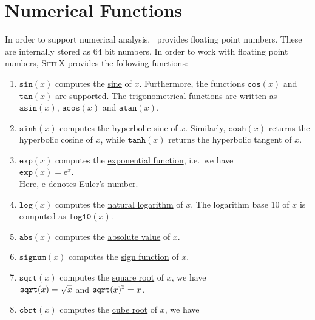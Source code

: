 \section{Numerical Functions}
In order to support numerical analysis, \setlx\ provides floating point numbers.  These are internally stored
as 64 bit numbers.  In order to work with floating point numbers,  \textsc{SetlX} provides the following functions:
\begin{enumerate}
\item $\texttt{sin}(x)$ computes the \href{https://en.wikipedia.org/wiki/Sine}{sine} of $x$.
      Furthermore, the  functions $\texttt{cos}(x)$ and $\texttt{tan}(x)$ are supported.  The
       trigonometrical functions are written as 
      $\texttt{asin}(x)$, $\texttt{acos}(x)$ and $\texttt{atan}(x)$.    
\item $\texttt{sinh}(x)$ computes the \href{https://en.wikipedia.org/wiki/Hyperbolic_function}{hyperbolic sine} of $x$.
      Similarly,  $\mathtt{cosh}(x)$ returns the hyperbolic cosine of $x$, while
      $\mathtt{tanh}(x)$ returns the hyperbolic tangent of $x$.
\item $\texttt{exp}(x)$ computes the \href{https://en.wikipedia.org/wiki/Exponential_function}{exponential
      function}, i.e.~we have 
      \\[0.2cm]
      \hspace*{1.3cm}
      $\texttt{exp}(x) = \mathrm{e}^x$.
      \\[0.2cm]
      Here, $\mathrm{e}$ denotes \href{https://en.wikipedia.org/wiki/E_(mathematical_constant)}{Euler's number}.
\item $\texttt{log}(x)$ computes the \href{https://en.wikipedia.org/wiki/Natural_logarithm}{natural logarithm} of  $x$.
      The logarithm base 10 of $x$ is computed as $\mathtt{log10}(x)$.
\item $\texttt{abs}(x)$ computes the \href{https://en.wikipedia.org/wiki/Absolute_value}{absolute value} of $x$.
\item $\mathtt{signum}(x)$ computes the \href{https://en.wikipedia.org/wiki/Sign_function}{sign function} of $x$.
\item $\texttt{sqrt}(x)$ computes the \href{https://en.wikipedia.org/wiki/Square_root}{square root} of $x$, we have
      \\[0.2cm]
      \hspace*{1.3cm}
      $\displaystyle\texttt{sqrt}(x) = \sqrt{x}$ \quad and \quad $\displaystyle \texttt{sqrt}(x)^2 = x$.
\item $\texttt{cbrt}(x)$ computes the \href{https://en.wikipedia.org/wiki/Cube_root}{cube root} of $x$, we have

\end{enumerate}
